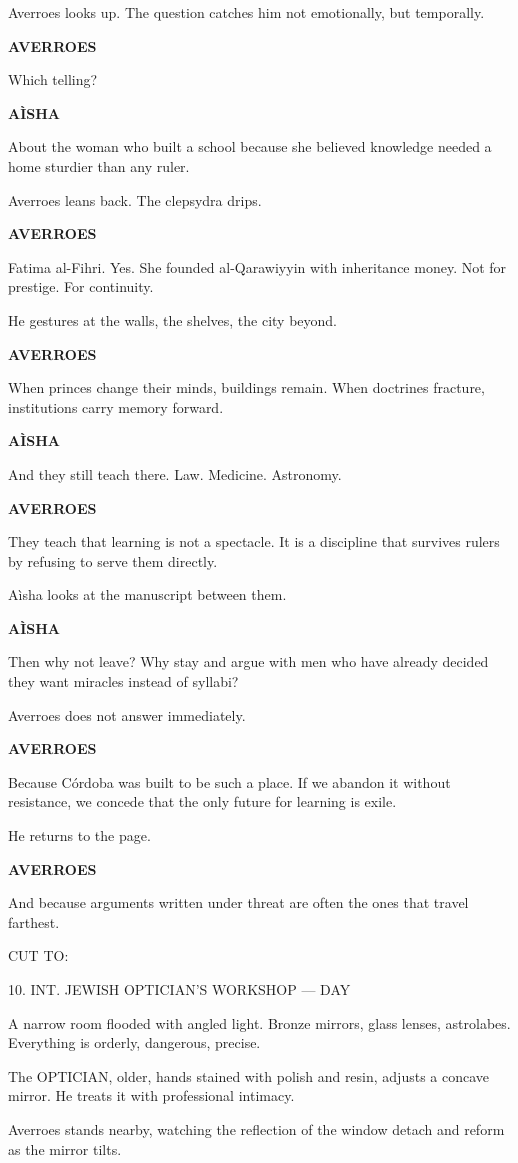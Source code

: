 \documentclass[12pt]{article}
\newlength{\charindent}
\newlength{\dialogueindent}
\newlength{\dialoguewidth}
\newlength{\transitionindent}
\newcommand{\slug}[1]{\vspace{1.25em}\textsc{#1}\vspace{0.5em}}
\newcommand{\action}[1]{#1}
\newcommand{\character}[1]{%
  \par\vspace{0.75em}%
  \hspace*{\charindent}\textbf{#1}%
}
\newcommand{\dialogue}[1]{%
  \par\nobreak
  \hspace*{\dialogueindent}%
  \begin{minipage}[t]{\dialoguewidth}
  #1
  \end{minipage}
}
\newcommand{\transition}[1]{%
  \par\vspace{1em}%
  \hspace*{\transitionindent}\textsc{#1}%
}
\begin{document}
\action{Averroes looks up. The question catches him not emotionally, but temporally.}

\character{AVERROES}
\dialogue{Which telling?}

\character{A\`ISHA}
\dialogue{About the woman who built a school because she believed knowledge needed a home sturdier than any ruler.}

\action{Averroes leans back. The clepsydra drips.}

\character{AVERROES}
\dialogue{Fatima al-Fihri. Yes. She founded al-Qarawiyyin with inheritance money. Not for prestige. For continuity.}

\action{He gestures at the walls, the shelves, the city beyond.}

\character{AVERROES}
\dialogue{When princes change their minds, buildings remain. When doctrines fracture, institutions carry memory forward.}

\character{A\`ISHA}
\dialogue{And they still teach there. Law. Medicine. Astronomy.}

\character{AVERROES}
\dialogue{They teach that learning is not a spectacle. It is a discipline that survives rulers by refusing to serve them directly.}

\action{A\`isha looks at the manuscript between them.}

\character{A\`ISHA}
\dialogue{Then why not leave? Why stay and argue with men who have already decided they want miracles instead of syllabi?}

\action{Averroes does not answer immediately.}

\character{AVERROES}
\dialogue{Because Córdoba was built to be such a place. If we abandon it without resistance, we concede that the only future for learning is exile.}

\action{He returns to the page.}

\character{AVERROES}
\dialogue{And because arguments written under threat are often the ones that travel farthest.}

\transition{CUT TO:}

\slug{10. INT. JEWISH OPTICIAN'S WORKSHOP --- DAY}

\action{A narrow room flooded with angled light. Bronze mirrors, glass lenses, astrolabes. Everything is orderly, dangerous, precise.}

\action{The OPTICIAN, older, hands stained with polish and resin, adjusts a concave mirror. He treats it with professional intimacy.}

\action{Averroes stands nearby, watching the reflection of the window detach and reform as the mirror tilts.}
\end{document}
